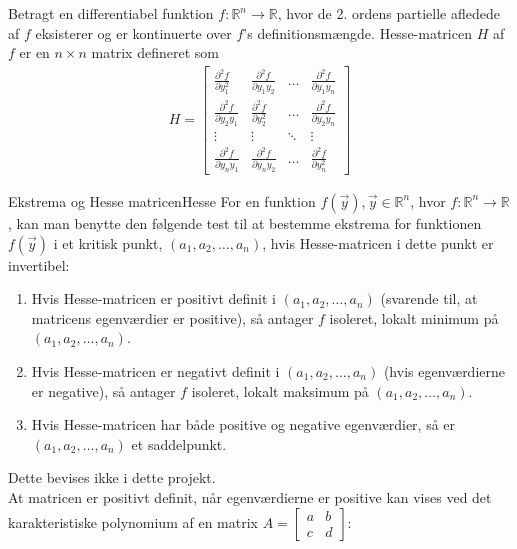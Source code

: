 \begin{definition}
Betragt en differentiabel funktion $f\colon \mathbb{R}^n\to \mathbb{R}$, hvor de 2. ordens partielle afledede af $f$ eksisterer og er kontinuerte over $f$'s definitionsmængde. Hesse-matricen $H$ af $f$ er en $n \times n$ matrix defineret som \\
\begin{align*}
    H=\begin{bmatrix}
    \frac{\partial^2 f}{\partial y_1^2} & \frac{\partial^2 f}{\partial y_1y_2} & \hdots & \frac{\partial^2 f}{\partial y_1y_n} \\
    \frac{\partial^2 f}{\partial y_2y_1} & \frac{\partial^2 f}{\partial y_2^2} & \hdots & \frac{\partial^2 f}{\partial y_2y_n} \\
    \vdots & \vdots & \ddots & \vdots \\
    \frac{\partial^2 f}{\partial y_ny_1} & \frac{\partial^2 f}{\partial y_ny_2} & \hdots & \frac{\partial^2 f}{\partial y_n^2}
    \end{bmatrix}
\end{align*}
\end{definition}
\begin{mytheo}{Ekstrema og Hesse matricen}{Hesse}
For en funktion $f(\vec{y}), \vec{y}\in \mathbb{R}^n$, hvor $f:\mathbb{R}^n \to \mathbb{R}$, kan man benytte den følgende test til at bestemme ekstrema for funktionen $f(\vec{y})$ i et kritisk punkt, $(a_1,a_2,\hdots,a_n)$, hvis  Hesse-matricen i dette punkt er invertibel:
\begin{enumerate}
    \item Hvis Hesse-matricen er positivt definit i $(a_1,a_2,\hdots, a_n)$ (svarende til, at matricens egenværdier er positive), så antager $f$ isoleret, lokalt minimum på $(a_1,a_2,\hdots, a_n)$.\\
    \item Hvis Hesse-matricen er negativt definit i $(a_1,a_2, \hdots, a_n)$ (hvis egenværdierne er negative), så antager $f$ isoleret, lokalt maksimum på $(a_1,a_2,\hdots, a_n)$.\\
    \item Hvis Hesse-matricen har både positive og negative egenværdier, så er $(a_1,a_2,\hdots, a_n)$ et saddelpunkt.
\end{enumerate}
\end{mytheo}
Dette bevises ikke i dette projekt. \\
At matricen er positivt definit, når egenværdierne er positive kan vises ved det karakteristiske polynomium af en matrix $A= \begin{bmatrix}
a & b\\
c & d
\end{bmatrix}$:
